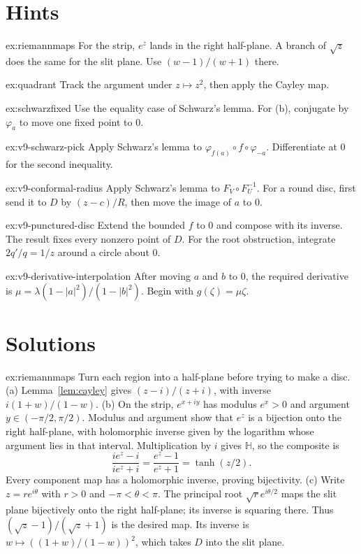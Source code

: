 \section{Hints}

\begin{hint}{ex:riemannmaps}
For the strip, $e^z$ lands in the right half-plane. A branch of $\sqrt z$
does the same for the slit plane. Use $(w-1)/(w+1)$ there.
\end{hint}
\begin{hint}{ex:quadrant}
Track the argument under $z\mapsto z^2$, then apply the Cayley map.
\end{hint}
\begin{hint}{ex:schwarzfixed}
Use the equality case of Schwarz's lemma. For (b), conjugate by
$\varphi_a$ to move one fixed point to $0$.
\end{hint}
\begin{hint}{ex:v9-schwarz-pick}
Apply Schwarz's lemma to $\varphi_{f(a)}\circ f\circ\varphi_{-a}$.
Differentiate at $0$ for the second inequality.
\end{hint}
\begin{hint}{ex:v9-conformal-radius}
Apply Schwarz's lemma to $F_V\circ F_U^{-1}$. For a round disc, first
send it to $D$ by $(z-c)/R$, then move the image of $a$ to $0$.
\end{hint}
\begin{hint}{ex:v9-punctured-disc}
Extend the bounded $f$ to $0$ and compose with its inverse. The result
fixes every nonzero point of $D$. For the root obstruction, integrate
$2q'/q=1/z$ around a circle about $0$.
\end{hint}
\begin{hint}{ex:v9-derivative-interpolation}
After moving $a$ and $b$ to $0$, the required derivative is
$\mu=\lambda(1-|a|^2)/(1-|b|^2)$. Begin with $g(\zeta)=\mu\zeta$.
\end{hint}

\section{Solutions}

\begin{solution}{ex:riemannmaps}
\idea Turn each region into a half-plane before trying to make a disc.
\writeup (a) Lemma~\ref{lem:cayley} gives $(z-i)/(z+i)$, with inverse
$i(1+w)/(1-w)$. (b) On the strip, $e^{x+iy}$ has modulus $e^x>0$ and
argument $y\in(-\pi/2,\pi/2)$. Modulus and argument show that $e^z$
is a bijection onto the right half-plane, with holomorphic inverse given
by the logarithm whose argument lies in that interval. Multiplication by
$i$ gives $\mathbb H$, so the composite is
\[
 \frac{ie^z-i}{ie^z+i}=\frac{e^z-1}{e^z+1}=\tanh(z/2).
\]
Every component map has a holomorphic inverse, proving bijectivity.
(c) Write $z=re^{i\theta}$ with $r>0$ and $-\pi<\theta<\pi$.
The principal root $\sqrt r e^{i\theta/2}$ maps the slit plane bijectively
onto the right half-plane; its inverse is squaring there.
Thus $(\sqrt z-1)/(\sqrt z+1)$ is the desired map. Its inverse is
$w\mapsto((1+w)/(1-w))^2$, which takes $D$ into the slit plane.
\end{solution}

